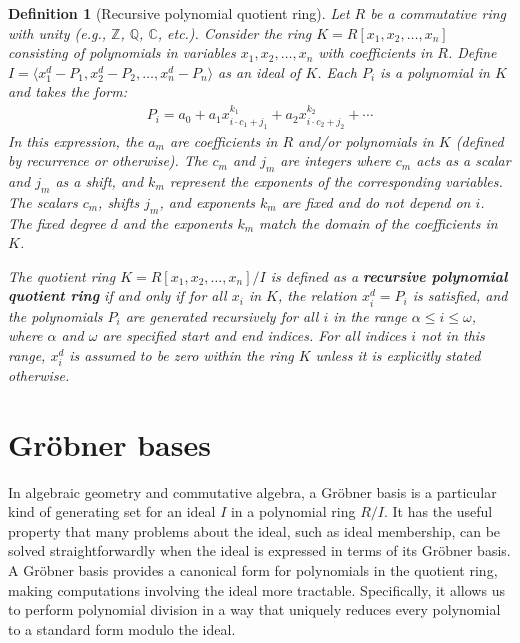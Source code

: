 \documentclass[12pt,reqno]{article}
\theoremstyle{plain}
\newtheorem{definition}[theorem]{Definition}
\newcommand{\Z}{\mathbb{Z}}
\begin{document}
\begin{definition}[Recursive polynomial quotient ring] \label{definition:recursivering}
Let $R$ be a commutative ring with unity (e.g., $\Z$, $\mathbb{Q}$, $\mathbb{C}$, etc.). Consider the ring $K = R[x_1, x_2, \ldots, x_{n} ]$ consisting of polynomials in variables $x_1, x_2, \ldots, x_n$ with coefficients in $R$. Define $I = \langle x_1^d - P_1, x_2^d - P_2, \ldots, x_n^d - P_n \rangle$ as an ideal of $K$. Each $P_i$ is a polynomial in $K$ and takes the form:
\begin{align*}
    P_i = a_0 + a_1 x_{i \cdot c_1 + j_1}^{k_1} + a_2 x_{i \cdot c_2 + j_2}^{k_2} + \cdots
\end{align*}
In this expression, the $a_m$ are coefficients in $R$ and/or polynomials in $K$ (defined by recurrence or otherwise). The $c_m$ and $j_m$ are integers where $c_m$ acts as a scalar and $j_m$ as a shift, and $k_m$ represent the exponents of the corresponding variables. The scalars $c_m$, shifts $j_m$, and exponents $k_m$ are fixed and do not depend on $i$. The fixed degree $d$ and the exponents $k_m$ match the domain of the coefficients in $K$.

The quotient ring $K = R[x_1, x_2, \ldots, x_{n}]/I$ is defined as a \textbf{recursive polynomial quotient ring} if and only if for all $x_i$ in $K$, the relation $x_i^d = P_i$ is satisfied, and the polynomials $P_i$ are generated recursively for all $i$ in the range $\alpha \leq i \leq \omega$, where $\alpha$ and $\omega$ are specified start and end indices. For all indices $i$ not in this range, $x_i^d$ is assumed to be zero within the ring $K$ unless it is explicitly stated otherwise.
\end{definition}

\section{Gröbner bases}
In algebraic geometry and commutative algebra, a Gröbner basis \cite{dube1990grobner} is a particular kind of generating set for an ideal $I$ in a polynomial ring $R/I$. It has the useful property that many problems about the ideal, such as ideal membership, can be solved straightforwardly when the ideal is expressed in terms of its Gröbner basis. A Gröbner basis provides a canonical form for polynomials in the quotient ring, making computations involving the ideal more tractable. Specifically, it allows us to perform polynomial division in a way that uniquely reduces every polynomial to a standard form modulo the ideal.
\end{document}
